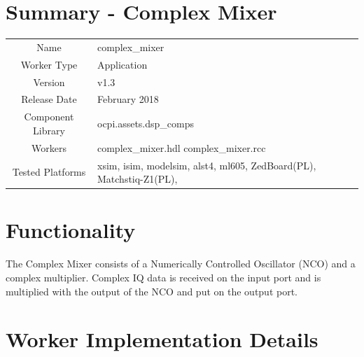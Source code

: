 \documentclass{article}
\author{} %
\date{Version \docVersion} %
\title{\docTitle}
\def\docVersion{1.3}
\def\comp{complex\_mixer}
\def\Comp{Complex Mixer}
\begin{document}
\section*{Summary - \Comp}
\begin{tabular}{|c|M{13.5cm}|}
	\hline
	                  &                                                    \\
	\hline
	Name              & \comp                                              \\
	\hline
	Worker Type       & Application                                        \\
	\hline
	Version           & v\docVersion \\
	\hline
	Release Date      & February 2018 \\
	\hline
	Component Library & ocpi.assets.dsp\_comps                              \\
	\hline
	Workers           & \comp.hdl \comp.rcc                                 \\
	\hline
	Tested Platforms  & xsim, isim, modelsim, alst4, ml605, ZedBoard(PL), Matchstiq-Z1(PL), \\
	\hline
\end{tabular}

\section*{Functionality}
\begin{flushleft}
	The Complex Mixer consists of a Numerically Controlled Oscillator (NCO) and a complex multiplier. Complex IQ data is received on the input port and is multiplied with the output of the NCO and put on the output port.
\end{flushleft}

\section*{Worker Implementation Details}
\end{document}
